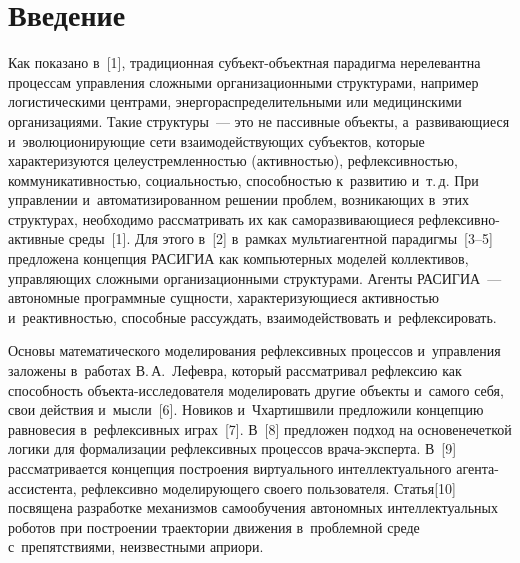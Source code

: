 \vspace*{9pt}

 


 

\thispagestyle{headings}

 

\begin{multicols}{2}

 

\label{st\stat}

 

\section{Введение}

 


 

  Как показано в~[1], традиционная субъ\-ект-объ\-ект\-ная парадигма 
нерелевантна процессам управле\-ния сложными организационными 
структурами, например логистическими цент\-ра\-ми, энерго\-рас\-пре\-де\-ли\-тель\-ны\-ми
или медицинскими организациями. Такие структуры~--- это не \mbox{пассивные} 
объекты, а~развивающиеся и~эво\-лю\-ци\-о\-ни\-ру\-ющие \mbox{сети} взаимодействующих 
субъектов, которые характеризуются це\-ле\-уст\-рем\-лен\-ностью (ак\-тив\-ностью), 
реф\-лек\-сив\-ностью, ком\-му\-ни\-ка\-тив\-ностью, со\-ци\-аль\-ностью, спо\-соб\-ностью 
к~развитию и~т.\,д. При управ\-ле\-нии и~автоматизированном решении 
проб\-лем, возникающих в~этих структурах, необходимо рассматривать их как 
са\-мо\-раз\-ви\-ва\-ющи\-еся реф\-лек\-сив\-но-ак\-тив\-ные среды~[1]. Для этого в~[2] в~рамках 
муль\-ти\-агент\-ной па\-ра\-диг\-мы~[3--5] предложена концепция 
\mbox{РАСИГИА} как компьютерных мо\-делей 
коллективов, управ\-ля\-ющих слож\-ны\-ми организационными структурами. 
Агенты \mbox{РАСИГИА}~--- автономные программные сущности, 
ха\-рак\-те\-ри\-зу\-ющи\-еся активностью и~ре\-ак\-тив\-ностью, \mbox{способные} рас\-суж\-дать, 
взаимодействовать и~реф\-лек\-си\-ро\-вать.
{

}

  
  Основы математического моделирования реф\-лек\-сив\-ных процессов 
  и~управ\-ле\-ния заложены в~работах В.\,А.~Лефевра, который рассматривал 
реф\-лек\-сию как спо\-соб\-ность объ\-ек\-та-ис\-сле\-до\-ва\-те\-ля моделировать 
другие объекты и~самого себя, свои действия и~мысли~[6]. Новиков 
и~Чхар\-ти\-шви\-ли предложили концепцию равновесия в~рефлексивных 
играх~[7]. В~[8] предложен подход на основе\linebreak нечеткой логики для 
формализации реф\-лек\-сив\-ных процессов вра\-ча-экс\-пер\-та. В~[9] 
рассмат\-ривает\-ся концепция по\-стро\-ения виртуального интеллектуального 
аген\-та-ас\-сис\-тен\-та, реф\-лек\-сив\-но моделирующего своего пользователя. 
\mbox{Статья}[10] посвящена разработке механизмов са\-мо\-обуче\-ния автономных 
интеллектуальных роботов при по\-стро\-ении траектории движения в~проб\-лем\-ной 
среде с~препятствиями, неизвестными априори.
{ %

}
\end{multicols}
